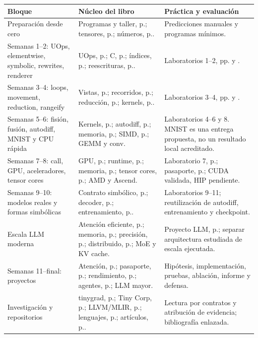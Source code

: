 \begin{longtable}{@{}P{.22\textwidth}P{.43\textwidth}P{.29\textwidth}@{}}
\toprule\textbf{Bloque} & \textbf{Núcleo del libro} & \textbf{Práctica y evaluación}\\\midrule\endhead
Preparación desde cero & Programas y taller, p.\pageref{ch:programa}; tensores, p.\pageref{ch:tensores}; números, p.\pageref{ch:numeros}. & Predicciones manuales y programas mínimos.\\
Semanas 1--2: UOps, elementwise, symbolic, rewrites, renderer & UOps, p.\pageref{ch:uops}; C, p.\pageref{ch:renderer}; índices, p.\pageref{ch:symbolic}; reescrituras, p.\pageref{ch:rewrites}. & Laboratorios 1--2, pp.\pageref{lab:uno} y \pageref{lab:dos}.\\
Semanas 3--4: loops, movement, reduction, rangeify & Vistas, p.\pageref{ch:movement}; recorridos, p.\pageref{ch:rangeify}; reducción, p.\pageref{ch:reducciones}; kernels, p.\pageref{ch:schedule}. & Laboratorios 3--4, pp.\pageref{lab:tres} y \pageref{lab:cuatro}.\\
Semanas 5--6: fisión, fusión, autodiff, MNIST y CPU rápida & Kernels, p.\pageref{ch:schedule}; autodiff, p.\pageref{ch:autodiff}; memoria, p.\pageref{ch:jerarquia}; SIMD, p.\pageref{ch:simd}; GEMM y conv. & Laboratorios 4--6 y 8. MNIST es una entrega propuesta, no un resultado local acreditado.\\
Semanas 7--8: call, GPU, aceleradores, tensor cores & GPU, p.\pageref{ch:gpu}; runtime, p.\pageref{ch:runtime}; memoria, p.\pageref{ch:gpu_memoria}; tensor cores, p.\pageref{ch:tensorcores}; AMD y Ascend. & Laboratorio 7, p.\pageref{lab:siete}; pasaporte, p.\pageref{project:pasaporte}; CUDA validada, HIP pendiente.\\
Semanas 9--10: modelos reales y formas simbólicas & Contrato simbólico, p.\pageref{curso:rangeify}; decoder, p.\pageref{ch:decoder-completo}; entrenamiento, p.\pageref{ch:train}. & Laboratorios 9--11; reutilización de autodiff, entrenamiento y checkpoint.\\
Escala LLM moderna & Atención eficiente, p.\pageref{ch:flash}; memoria, p.\pageref{ch:escalar}; precisión, p.\pageref{ch:precision-mixta}; distribuido, p.\pageref{ch:distribuido}; MoE y KV cache. & Proyecto LLM, p.\pageref{project:llm}; separar arquitectura estudiada de escala ejecutada.\\
Semanas 11--final: proyectos & Atención, p.\pageref{project:atencion}; pasaporte, p.\pageref{project:pasaporte}; rendimiento, p.\pageref{project:competitivo}; agentes, p.\pageref{project:agente}; LLM mayor. & Hipótesis, implementación, pruebas, ablación, informe y defensa.\\
Investigación y repositorios & tinygrad, p.\pageref{ch:atlas-tinygrad}; Tiny Corp, p.\pageref{ch:tinycorp-sistemas}; LLVM/MLIR, p.\pageref{ch:ssa-mlir}; lenguajes, p.\pageref{ch:atlas-lenguajes}; artículos, p.\pageref{ch:articulos-2026}. & Lectura por contratos y atribución de evidencia; bibliografía enlazada.\\
\bottomrule\end{longtable}

